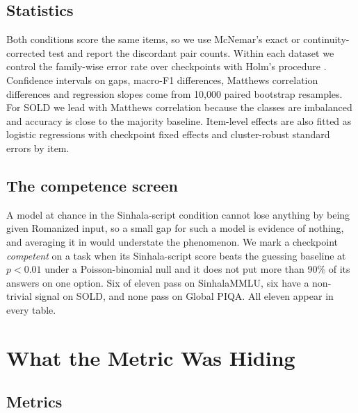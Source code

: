 \documentclass[11pt]{article}
\begin{document}
\subsection{Statistics}
\label{sec:stats}

Both conditions score the same items, so we use McNemar's exact or
continuity-corrected test \citep{mcnemar-1947, dror-etal-2018-hitchhikers} and
report the discordant pair counts. Within each dataset we control the family-wise
error rate over checkpoints with Holm's procedure \citep{holm-1979}. Confidence
intervals on gaps, macro-F1 differences, Matthews correlation differences and
regression slopes come from 10{,}000 paired bootstrap resamples. For SOLD we
lead with Matthews correlation \citep{matthews-1975, chicco-jurman-2020} because
the classes are imbalanced and accuracy is close to the majority baseline.
Item-level effects are also fitted as logistic regressions with checkpoint fixed
effects and cluster-robust standard errors by item.

\subsection{The competence screen}
\label{sec:screen}

A model at chance in the Sinhala-script condition cannot lose anything by being
given Romanized input, so a small gap for such a model is evidence of nothing, and
averaging it in would understate the phenomenon. We mark a checkpoint
\emph{competent} on a task when its Sinhala-script score beats the guessing
baseline at $p < 0.01$ under a Poisson-binomial null and it does not put more than
90\% of its answers on one option. Six of eleven pass on SinhalaMMLU, six have a
non-trivial signal on SOLD, and none pass on Global PIQA. All eleven appear in
every table.


\section{What the Metric Was Hiding}
\label{sec:intrinsic}

\subsection{Metrics}
\end{document}

